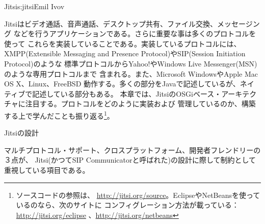 \begin{aosachapter}{Jitsi}{s:jitsi}{Emil Ivov}

Jitsiはビデオ通話、音声通話、デスクトップ共有、ファイル交換、メッセージング
などを行うアプリケーションである。さらに重要な事は多くのプロトコルを使って
これらを実装していることである。実装しているプロトコルには、XMPP(Extensible Messaging
and Presence Protocol)やSIP(Session Initiation Protocol)のような
標準プロトコルからYahoo!やWindows Live Messenger(MSN)のような専用プロトコルまで
含まれる。また、Microsoft WindowsやApple Mac OS X、Linux、FreeBSD
動作する。多くの部分をJavaで記述しているが、ネイティブで記述している部分もある。
本章では、JitsiのOSGiベース・アーキテクチャに注目する。プロトコルをどのように実装および
管理しているのか、構築する上で学んだことも振り返る\footnote{ソースコードの参照は、
\url{http://jitsi.org/source}。EclipseやNetBeansを使っているのなら、次のサイトに
コンフィグレーション方法が載っている： \url{http://jitsi.org/eclipse}
、\url{http://jitsi.org/netbeans}}。

\begin{aosasect1}{Jitsiの設計}

マルチプロトコル・サポート、クロスプラットフォーム、開発者フレンドリーの３点が、
Jitsi(かつてSIP Communicatorと呼ばれた)の設計に際して制約として重視している項目である。


\end{aosasect1}
\end{aosachapter}
